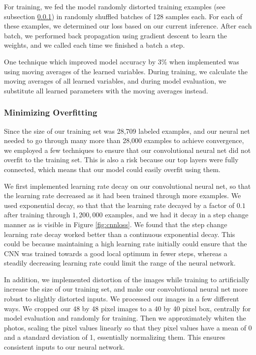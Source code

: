 \documentclass[10pt, twocolumn, twoside]{article}
\begin{document}
For training, we fed the model randomly distorted training examples (see subsection \ref{overfitting}) in randomly shuffled batches of 128 samples each. For each of these examples, we determined our loss based on our current inference. After each batch, we performed back propagation using gradient descent to learn the weights, and we called each time we finished a batch a step. 

One technique which improved model accuracy by $3\%$ when implemented was using moving averages of the learned variables. During training, we calculate the moving averages of all learned variables, and during model evaluation, we substitute all learned parameters with the moving averages instead.


\subsubsection{Minimizing Overfitting} \label{overfitting}

Since the size of our training set was 28,709 labeled examples, and our neural net needed to go through many more than 28,000 examples to achieve convergence, we employed a few techniques to ensure that our convolutional neural net did not overfit to the training set. This is also a risk because our top layers were fully connected, which means that our model could easily overfit using them.

We first implemented learning rate decay on our convolutional neural net, so that the learning rate decreased as it had been trained through more examples. We used exponential decay, so that that the learning rate decayed by a factor of $0.1$ after training through $1,200,000$ examples, and we had it decay in a step change manner as is visible in Figure \ref{fig:cnnloss}. We found that the step change learning rate decay worked better than a continuous exponential decay. This could be because maintaining a high learning rate initially could ensure that the CNN was trained towards a good local optimum in fewer steps, whereas a steadily decreasing learning rate could limit the range of the neural network.

In addition, we implemented distortion of the images while training to artificially increase the size of our training set, and make our convolutional neural net more robust to slightly distorted inputs. We processed our images in a few different ways. We cropped our 48 by 48 pixel images to a 40 by 40 pixel box, centrally for model evaluation and randomly for training. Then we approximately whiten the photos, scaling the pixel values linearly so that they pixel values have a mean of 0 and a standard deviation of 1, essentially normalizing them. This ensures consistent inputs to our neural network.
\end{document}
